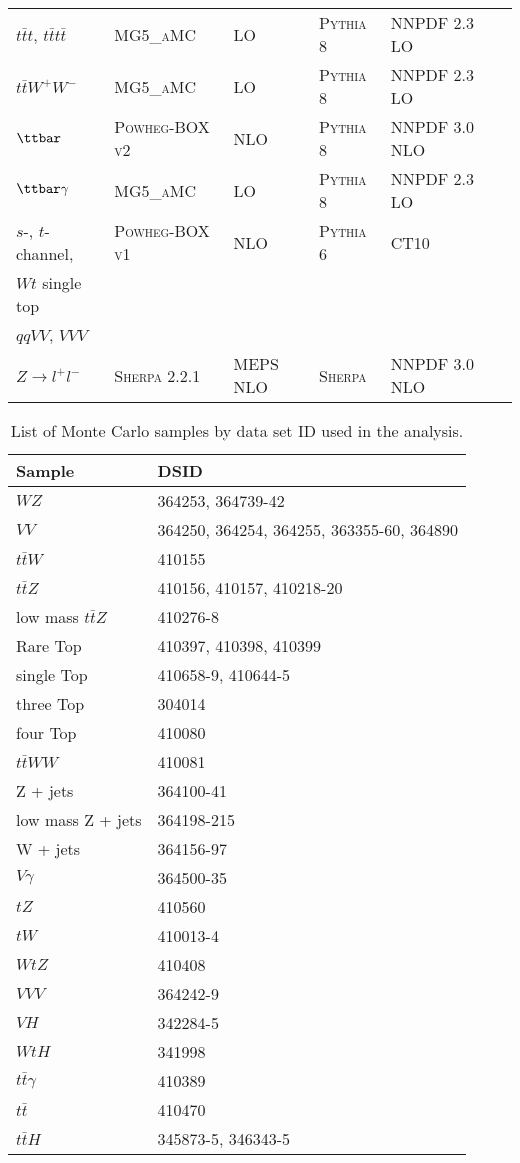 \begin{table}[H]
\begin{center}
{\begin{tabular}{llllll}
$t\bar t t$, $t\bar t t\bar t$ & \textsc{MG5\_aMC} & LO & \textsc{Pythia} 8 & NNPDF 2.3 LO  \\
$t\bar t W^+ W^-$ & \textsc{MG5\_aMC} & LO & \textsc{Pythia} 8 & NNPDF 2.3 LO\\
$\ttbar$ & \textsc{Powheg-BOX v2} \cite{powhegtt} & NLO & \textsc{Pythia} 8 & NNPDF 3.0 NLO  \\
$\ttbar\gamma$ & \textsc{MG5\_aMC} & LO & \textsc{Pythia} 8 & NNPDF 2.3 LO \\
$s$-, $t$-channel, & \textsc{Powheg-BOX v1} \cite{powhegstp}& NLO & \textsc{Pythia} 6 & CT10 \\
 $Wt$ single top & & & &  \\
$qqVV$, $VVV$ & &   \\
$Z \to l^+l^-$ & \textsc{Sherpa} 2.2.1 & MEPS NLO  & \textsc{Sherpa} & NNPDF 3.0 NLO \\
\hline\hline
\end{tabular}
}
\end{center}
\end{table}

\begin{table}[H]
    \centering
    \begin{tabular}{l|l}
        \hline\hline
        Sample & DSID \\
        \hline\hline
        $WZ$ & 364253, 364739-42 \\
        $VV$ & 364250, 364254, 364255, 363355-60, 364890 \\
        $t\bar{t}W$ & 410155 \\
        $t\bar{t}Z$ & 410156, 410157, 410218-20 \\
        low mass $t\bar{t}Z$ & 410276-8 \\
        Rare Top & 410397, 410398, 410399 \\
        single Top & 410658-9, 410644-5 \\
        three Top & 304014 \\
        four Top & 410080 \\
        $t\bar{t}WW$ & 410081 \\
        Z + jets & 364100-41 \\
        low mass Z + jets & 364198-215 \\
        W + jets & 364156-97 \\
        $V\gamma$ & 364500-35 \\
        $tZ$  & 410560 \\
        $tW$  & 410013-4 \\
        $WtZ$ & 410408 \\
        $VVV$ & 364242-9 \\
        $VH$ & 342284-5 \\
        $WtH$ & 341998 \\
        $t\bar{t}\gamma$ & 410389 \\
        $t\bar{t}$ & 410470 \\
        $t\bar{t}H$ & 345873-5, 346343-5 \\
        \hline\hline
    \end{tabular}
    \caption{List of Monte Carlo samples by data set ID used in the analysis.}
    \label{tbl:dsids}
\end{table}
